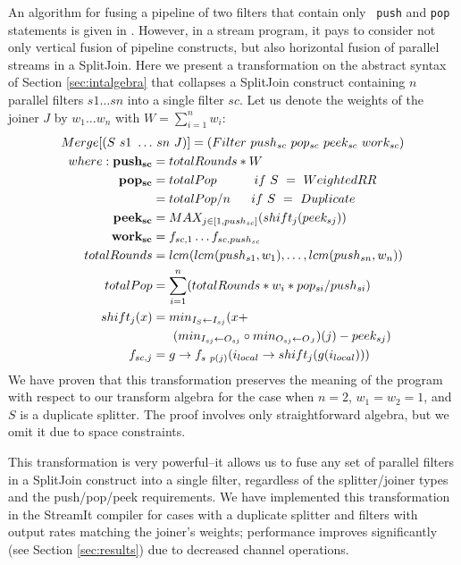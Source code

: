 An algorithm for fusing a pipeline of two filters that contain only {\tt
push} and {\tt pop} statements is given in \cite{pro96}.  However, in a
stream program, it pays to consider not only vertical fusion of pipeline
constructs, but also horizontal fusion of parallel streams in a
SplitJoin.  Here we present a transformation on the abstract syntax of
Section \ref{sec:intalgebra} that collapses a SplitJoin construct
containing $n$ parallel filters $s1 \dots sn$ into a single filter $sc$.
Let us denote the weights of the joiner $J$ by $w_1 \dots w_n$ with $W =
\sum_{i=1}^{n}{w_i}$:
\begin{align*}
Merge[(S~s1~\dots&~sn~J)] = (Filter~push_{sc}~pop_{sc}~peek_{sc}~work_{sc}) \\
where: {\bf push_{sc}} &= totalRounds * W \\
       {\bf pop_{sc}} &= totalPop ~~~~~~~~~if~S~=~WeightedRR \\
                &= totalPop / n ~~~~~if~S~=~Duplicate \\
       {\bf peek_{sc}} &= MAX_{j \in [1,push_{sc}]}(shift_j(peek_{sj})) \\
       {\bf work_{sc}} &= f_{sc, 1} \dots f_{sc, push_{sc}} \\
       totalRounds &= lcm(lcm(push_{s1}, w_1), \dots, lcm(push_{sn},
       w_n)) \\
       totalPop &= \sum_{i=1}^{n}(totalRounds * w_i * pop_{si} / push_{si}) \\
       shift_j(x) &= min_{I_S \leftarrow I_{sj}}(x + \\ &~~~~~(min_{I_{sj} \leftarrow O_{sj}} \circ min_{O_{sj} \leftarrow O_J})(j)-peek_{sj}) \\
       f_{sc, j} &= g \rightarrow f_{s~p(j)}(i_{local} \rightarrow shift_j(g(i_{local})))
\end{align*}
We have proven that this transformation preserves the meaning of the
program with respect to our transform algebra for the case when $n = 2$,
$w_1 = w_2 = 1$, and $S$ is a duplicate splitter.  The proof involves
only straightforward algebra, but we omit it due to space constraints.

This transformation is very powerful--it allows us to fuse any set of
parallel filters in a SplitJoin construct into a single filter,
regardless of the splitter/joiner types and the push/pop/peek
requirements.  We have implemented this transformation in the StreamIt
compiler for cases with a duplicate splitter and filters with output
rates matching the joiner's weights; performance improves significantly
(see Section \ref{sec:results}) due to decreased channel operations.

